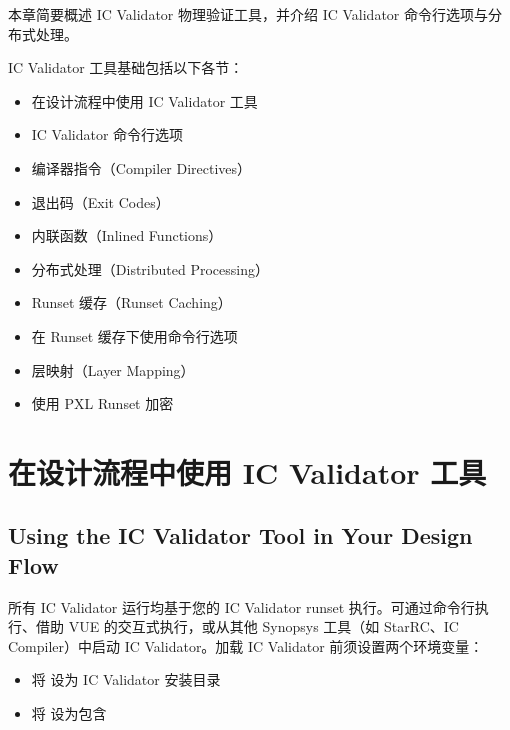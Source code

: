 \label{chap:basics}

本章简要概述 IC Validator 物理验证工具，并介绍 IC Validator 命令行选项与分布式处理。

IC Validator 工具基础包括以下各节：
\begin{itemize}
  \item 在设计流程中使用 IC Validator 工具
  \item IC Validator 命令行选项
  \item 编译器指令（Compiler Directives）
  \item 退出码（Exit Codes）
  \item 内联函数（Inlined Functions）
  \item 分布式处理（Distributed Processing）
  \item Runset 缓存（Runset Caching）
  \item 在 Runset 缓存下使用命令行选项
  \item 层映射（Layer Mapping）
  \item 使用 PXL Runset 加密
\end{itemize}

\section{在设计流程中使用 IC Validator 工具}
\subsection*{Using the IC Validator Tool in Your Design Flow}

所有 IC Validator 运行均基于您的 IC Validator runset 执行。可通过命令行执行、借助 VUE 的交互式执行，或从其他 Synopsys 工具（如 StarRC、IC Compiler）中启动 IC Validator。加载 IC Validator 前须设置两个环境变量：
\begin{itemize}
  \item 将  设为 IC Validator 安装目录
  \item 将  设为包含 
\end{itemize}

